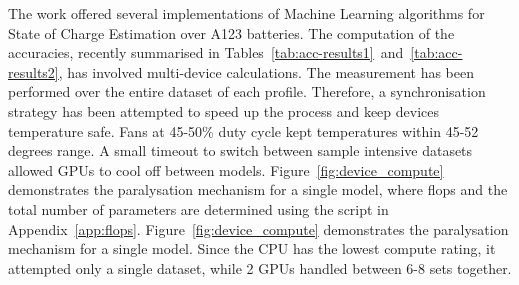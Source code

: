 The work offered several implementations of Machine Learning algorithms for State of Charge Estimation over A123 batteries.
The computation of the accuracies, recently summarised in \mbox{Tables~\ref{tab:acc-results1} and~\ref{tab:acc-results2}}, has involved multi-device calculations.
The measurement has been performed over the entire dataset of each profile.
Therefore, a synchronisation strategy has been attempted to speed up the process and keep devices temperature safe.
Fans at 45-50\% duty cycle kept temperatures within 45-52 degrees range.
A small timeout to switch between sample intensive datasets allowed GPUs to cool off between models.
%
%
{
\mbox{Figure~\ref{fig:device_compute}} demonstrates the paralysation mechanism for a single model, where flops and the total number of parameters are determined using the script in Appendix~\ref{app:flops}.
}
{
\mbox{Figure~\ref{fig:device_compute}} demonstrates the paralysation mechanism for a single model.
}
Since the CPU has the lowest compute rating, it attempted only a single dataset, while 2 GPUs handled between 6-8 sets together. 

